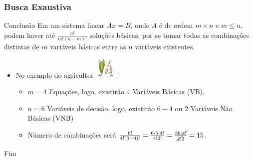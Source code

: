 \documentclass{beamer}
\begin{document}
\begin{frame}
	\frametitle{Busca Exaustiva}
	\begin{alertblock}{Conclusão}
		Em um sistema linear $Ax = B$, onde $A$ é de ordem $m \times n$ e $m \le n$, podem haver até $\frac{n!}{m!(n-m)!}$ soluções básicas, por se tomar todas as combinações distintas de $m$ variáveis básicas entre as $n$ variáveis existentes. 
	\end{alertblock}
	{
	\begin{itemize}
	\item[] No exemplo do agricultor \hspace{0.3cm} \includegraphics[width=1cm,height=1cm]{milho_aveia2.png} :
		\begin{itemize}
		\item $m=4$ Equações, logo, existirão 4 Variáveis Básicas (VB).
		\item $n=6$ Variáveis de decisão, logo, existirão $6-4$ ou $2$ Variáveis Não Básicas (VNB)
		\item Número de combinações será 
		$\frac{6!}{4!(6-4)!}=\frac{6 \cdot5 \cdot 4!}{4!2!}=\frac{30 \cdot \cancel{4!}}{\cancel{4!}2}=15$.
		\end{itemize}
	\end{itemize}
	}
\end{frame}

\begin{frame}
\Huge{\centerline{Fim}}
\end{frame}

\end{document}
